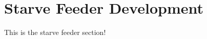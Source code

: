 \section{Starve Feeder Development\label{methedology:starveFeeder}}
This is the starve feeder section!
